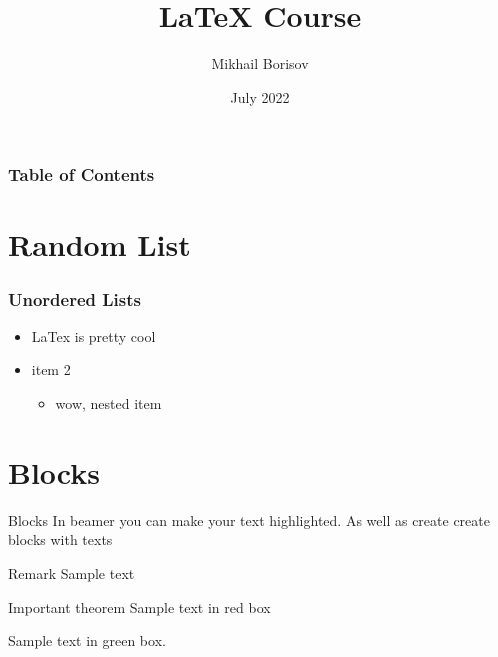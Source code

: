\documentclass{beamer}
\title{LaTeX Course}
\author{Mikhail Borisov}
\institute{HSE}
\date{July 2022}
\begin{document}
\frame{\titlepage}


\begin{frame}
\frametitle{Table of Contents}
\tableofcontents
\end{frame}

\section{Random List}
\begin{frame}
\frametitle{Unordered Lists}
\begin{itemize}
    \item LaTex is pretty cool
    \item item 2
    \begin{itemize}
        \item wow, nested item
    \end{itemize}
\end{itemize}
\end{frame}

\section{Blocks}
\begin{frame}{Blocks}
In beamer you can make your text \alert{highlighted}. As well as create create blocks with texts

\begin{block}{Remark}
Sample text
\end{block}

\begin{alertblock}{Important theorem}
Sample text in red box
\end{alertblock}

\begin{examples}
Sample text in green box.
\end{examples}
\end{frame}
\end{document}
